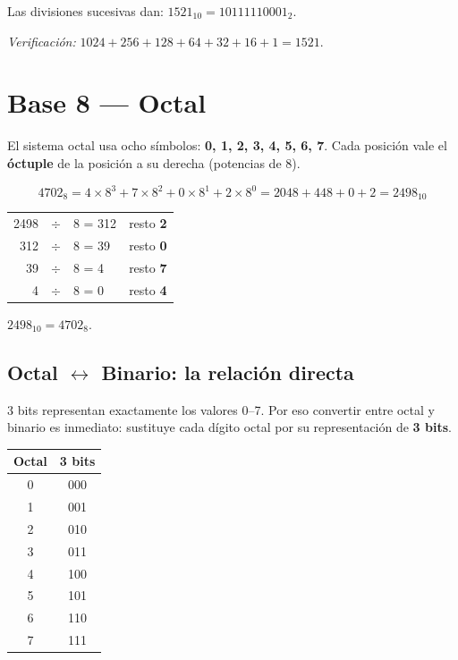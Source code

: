 \documentclass[12pt, oneside]{article}
\begin{document}
\begin{ejemplo}
Las divisiones sucesivas dan: $1521_{10} = 10111110001_2$.

\textit{Verificación:}
$1024 + 256 + 128 + 64 + 32 + 16 + 1 = 1521$. \checkmark
\end{ejemplo}

\section{Base 8 — Octal}

El sistema octal usa ocho símbolos: \textbf{0, 1, 2, 3, 4, 5, 6, 7}.
Cada posición vale el \textbf{óctuple} de la posición a su derecha
(potencias de 8).

\begin{ejemplo}
\[
  4702_8
  = 4 \times 8^3 + 7 \times 8^2 + 0 \times 8^1 + 2 \times 8^0
  = 2048 + 448 + 0 + 2
  = 2498_{10}
\]
\end{ejemplo}

\begin{ejemplo}
\begin{center}
\begin{tabular}{r@{\;}c@{\;}l@{\quad}l}
  2498 & $\div$ & 8 = 312 & resto \textbf{2} \\
   312 & $\div$ & 8 = 39  & resto \textbf{0} \\
    39 & $\div$ & 8 = 4   & resto \textbf{7} \\
     4 & $\div$ & 8 = 0   & resto \textbf{4} \\
\end{tabular}
\end{center}
$2498_{10} = 4702_8$. \checkmark
\end{ejemplo}

\subsection{Octal $\leftrightarrow$ Binario: la relación directa}

3 bits representan exactamente los valores 0–7.
Por eso convertir entre octal y binario es inmediato: sustituye cada dígito
octal por su representación de \textbf{3 bits}.

\begin{center}
\begin{tabular}{cc}
  \toprule
  \textbf{Octal} & \textbf{3 bits} \\
  \midrule
  0 & 000 \\ 1 & 001 \\ 2 & 010 \\ 3 & 011 \\
  4 & 100 \\ 5 & 101 \\ 6 & 110 \\ 7 & 111 \\
  \bottomrule
\end{tabular}
\end{center}
\end{document}
